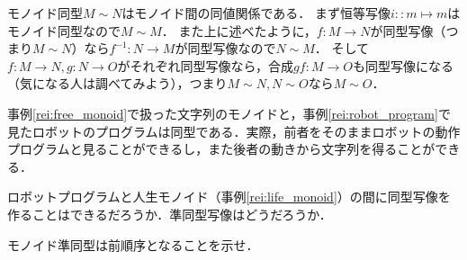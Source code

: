 \documentclass[11pt,a4paper, dvipdfmx]{jsarticle}
\begin{document}
モノイド同型$M \sim N$はモノイド間の同値関係である．
まず恒等写像$i::m \mapsto m$はモノイド同型なので$M \sim M$．
また上に述べたように，$f:M \to N$が同型写像（つまり$M \sim N$）なら$f^{-1}:N \to M$が同型写像なので$N \sim M$．
そして$f:M \to N, g:N \to O$がそれぞれ同型写像なら，合成$gf:M \to O$も同型写像になる（気になる人は調べてみよう），つまり$M \sim N, N \sim O$なら$M \sim O$．

\begin{rei}{}{}
    事例\ref{rei:free_monoid}で扱った文字列のモノイドと，事例\ref{rei:robot_program}で見たロボットのプログラムは同型である．実際，前者をそのままロボットの動作プログラムと見ることができるし，また後者の動きから文字列を得ることができる．
\end{rei}

\begin{renshu}{}{}
    ロボットプログラムと人生モノイド（事例\ref{rei:life_monoid}）の間に同型写像を作ることはできるだろうか．準同型写像はどうだろうか．
\end{renshu}

\begin{renshu}{}{}
モノイド準同型は前順序となることを示せ．
\end{renshu}



\end{document}
